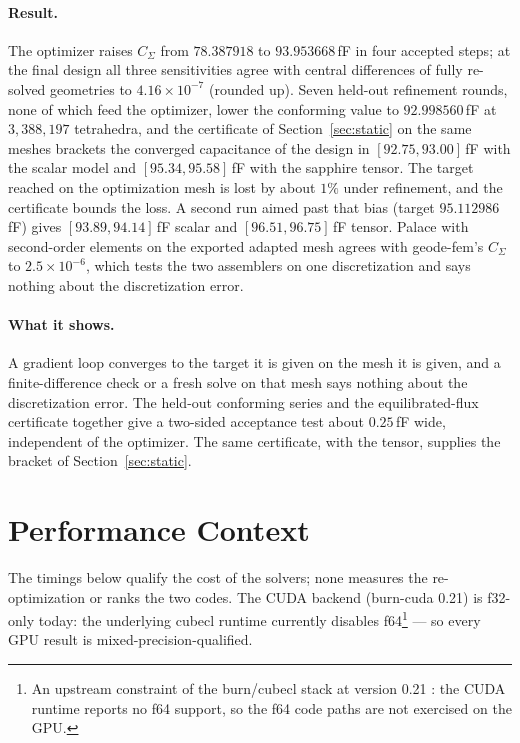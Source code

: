 \documentclass{anvil-paper}
\begin{document}
\paragraph{Result.}
The optimizer raises $C_\Sigma$ from $78.387918$ to $93.953668$\,fF in four
accepted steps; at the final design all three sensitivities agree with
central differences of fully re-solved geometries to $4.16\times10^{-7}$
(rounded up). Seven held-out refinement rounds, none of which feed the
optimizer, lower the conforming value to $92.998560$\,fF at
$3{,}388{,}197$ tetrahedra, and the certificate of
Section~\ref{sec:static} on the same meshes brackets the converged
capacitance of the design in $[92.75, 93.00]$\,fF with the scalar model
and $[95.34, 95.58]$\,fF with the sapphire tensor. The target reached on
the optimization mesh is lost by about $1\%$ under refinement, and the
certificate bounds the loss. A second run aimed past that bias
(target $95.112986$\,fF) gives $[93.89, 94.14]$\,fF scalar and
$[96.51, 96.75]$\,fF tensor. Palace with second-order elements on the
exported adapted mesh agrees with geode-fem's $C_\Sigma$ to
$2.5\times10^{-6}$, which tests the two assemblers on one discretization
and says nothing about the discretization error.

\paragraph{What it shows.}
A gradient loop converges to the target it is given on the mesh it is
given, and a finite-difference check or a fresh solve on that mesh says
nothing about the discretization error. The held-out conforming series
and the equilibrated-flux certificate together give a two-sided
acceptance test about $0.25$\,fF wide, independent of the optimizer. The
same certificate, with the tensor, supplies the bracket of
Section~\ref{sec:static}.

\section{Performance Context}
\label{sec:appendix-perf}

The timings below qualify the cost of the solvers; none measures the
re-optimization or ranks the two codes. The CUDA
backend (burn-cuda 0.21) is f32-only today: the underlying cubecl runtime
currently disables f64\footnote{An upstream constraint of the
burn/cubecl stack at version 0.21 \citep{burn}: the CUDA runtime reports
no f64 support, so the f64 code paths are not exercised on the GPU.} --- so every GPU result is
mixed-precision-qualified.
\end{document}
